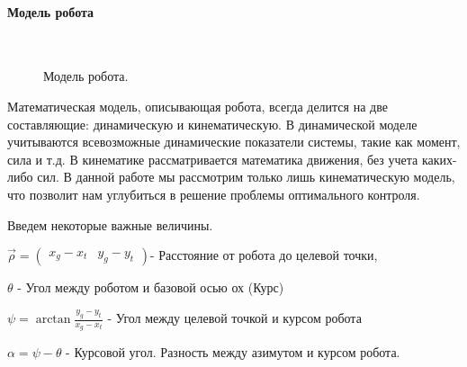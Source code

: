\documentclass[12pt,a4paper,openany]{extarticle}
\begin{document}
\paragraph*{Модель робота}$\phantom{-}$\\
\begin{figure}[h!]
	\vspace{1cm}
	\caption{Модель робота.}
	\label{fig:model}
\end{figure}

\hspace*{\parindent} Математическая модель, описывающая робота, всегда делится на две составляющие: динамическую и кинематическую. В динамической моделе учитываются всевозможные динамические показатели системы, такие как момент, сила и т.д. В кинематике рассматривается математика движения, без учета каких-либо сил. В данной работе мы рассмотрим только лишь кинематическую модель, что позволит нам углубиться в решение проблемы оптимального контроля.


Введем некоторые важные величины.

$\vec{\rho} = \begin{pmatrix}x_g - x_t & y_g - y_t\end{pmatrix}$- Расстояние от робота до целевой точки,

$\theta$ - Угол между роботом и базовой осью ох (Курс)

$\psi = \arctan \frac{y_g - y_t}{x_g - x_t}$ - Угол между целевой точкой и курсом робота

$\alpha = \psi - \theta$ - Курсовой угол. Разность между азимутом и курсом робота.
\end{document}
